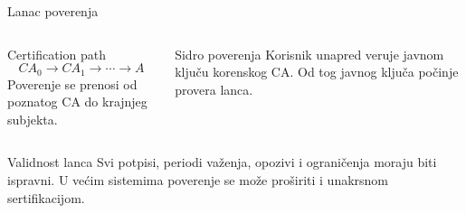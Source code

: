 \documentclass[aspectratio=1610]{beamer}
\begin{document}
\begin{frame}[t]{Lanac poverenja}
\small
\centering
{}

\vspace{0.6em}
\begin{columns}[T,onlytextwidth]
\begin{block}{Certification path}
\[
CA_0 \rightarrow CA_1 \rightarrow \cdots \rightarrow A
\]
Poverenje se prenosi od poznatog CA do krajnjeg subjekta.
\end{block}

\begin{block}{Sidro poverenja}
Korisnik unapred veruje javnom ključu korenskog CA. Od tog javnog ključa počinje provera lanca.
\end{block}
\end{columns}

\vspace{0.25em}
\begin{alertblock}{Validnost lanca}
Svi potpisi, periodi važenja, opozivi i ograničenja moraju biti ispravni. U većim sistemima poverenje se može proširiti i unakrsnom sertifikacijom.
\end{alertblock}
\end{frame}
\end{document}
